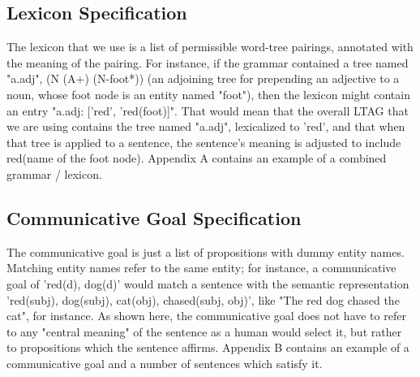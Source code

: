 \subsection{Lexicon Specification}

The lexicon that we use is a list of permissible word-tree pairings, annotated with the meaning of
the pairing.  For instance, if the grammar contained a tree named "a.adj", (N (A+) (N-foot*))
(an adjoining tree for prepending an adjective to a noun, whose foot node is an entity named "foot"),
then the lexicon might contain an entry "a.adj: ['red', 'red(foot)]".  That would mean that the overall
LTAG that we are using contains the tree named "a.adj", lexicalized to 'red', and that when that tree
is applied to a sentence, the sentence's meaning is adjusted to include red(name of the foot node).
Appendix A contains an example of a combined grammar / lexicon.

\subsection{Communicative Goal Specification}

The communicative goal is just a list of propositions with dummy entity names.  Matching entity
names refer to the same entity; for instance, a communicative goal of 'red(d), dog(d)' would
match a sentence with the semantic representation 'red(subj), dog(subj), cat(obj), chased(subj, obj)',
like "The red dog chased the cat", for instance.  As shown here, the communicative goal does
not have to refer to any "central meaning" of the sentence as a human would select it, but rather
to propositions which the sentence affirms.  Appendix B contains an example of a communicative
goal and a number of sentences which satisfy it.

